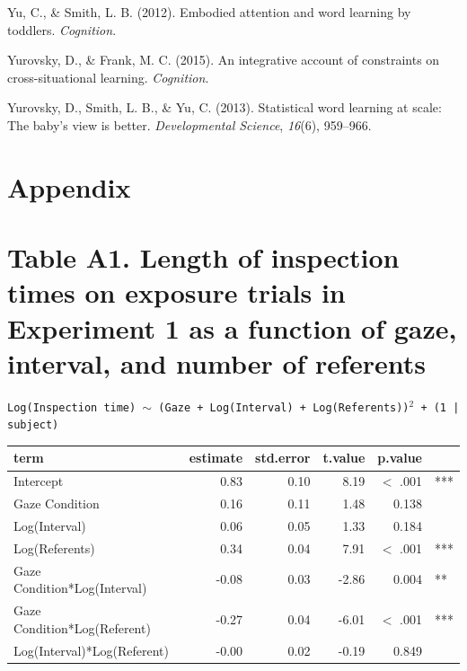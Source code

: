 \documentclass[authoryear, review]{elsarticle}
\begin{document}
\hypertarget{ref-yu2012embodied}{}
Yu, C., \& Smith, L. B. (2012). Embodied attention and word learning by
toddlers. \emph{Cognition}.

\hypertarget{ref-yurovsky2014algorithmic}{}
Yurovsky, D., \& Frank, M. C. (2015). An integrative account of
constraints on cross-situational learning. \emph{Cognition}.

\hypertarget{ref-yurovsky2013statistical}{}
Yurovsky, D., Smith, L. B., \& Yu, C. (2013). Statistical word learning
at scale: The baby's view is better. \emph{Developmental Science},
\emph{16}(6), 959--966.



\newpage

\section*{Appendix}

\captionsetup[table]{labelformat=empty}

\section*{Table A1. Length of inspection times on exposure trials in Experiment 1 as a function of gaze, interval, and number of referents}

\texttt{Log(Inspection time) $\sim$ (Gaze + Log(Interval) + Log(Referents))$^2$ + (1 | subject)}

\begin{table}[h]
\centering
\begin{tabular}{lrrrrl}
 term & estimate & std.error & t.value & p.value &  \\ 
  \hline
Intercept & 0.83 & 0.10 & 8.19 & $<$ .001 & *** \\ 
  Gaze Condition & 0.16 & 0.11 & 1.48 & 0.138 &  \\ 
  Log(Interval) & 0.06 & 0.05 & 1.33 & 0.184 &  \\ 
  Log(Referents) & 0.34 & 0.04 & 7.91 & $<$ .001 & *** \\ 
  Gaze Condition*Log(Interval) & -0.08 & 0.03 & -2.86 & 0.004 & ** \\ 
  Gaze Condition*Log(Referent) & -0.27 & 0.04 & -6.01 & $<$ .001 & *** \\ 
  Log(Interval)*Log(Referent) & -0.00 & 0.02 & -0.19 & 0.849 &  \\ 
   \hline
\end{tabular}
\label{tab:e1_rt}
\end{table}
\end{document}
